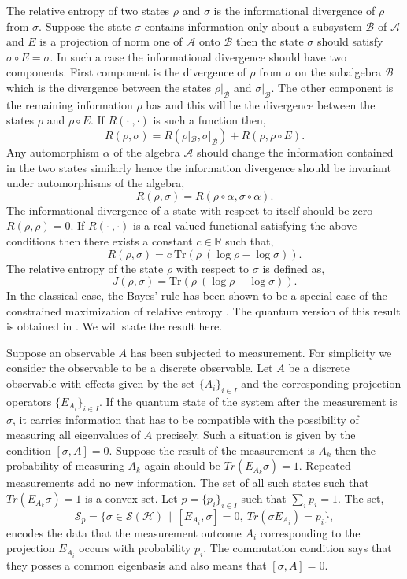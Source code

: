 \documentclass[11pt]{report}
\begin{document}
The relative entropy of two states $\rho$ and $\sigma$ is the informational divergence of $\rho$ from $\sigma$. Suppose the state $\sigma$ contains information only about a subsystem $\mathcal{B}$ of $\mathcal{A}$ and $E$ is a projection of norm one of $\mathcal{A}$ onto $\mathcal{B}$ then the state $\sigma$ should satisfy $\sigma\circ E= \sigma$.  In such a case the informational divergence should have two components. First component is the divergence of $\rho$ from $\sigma$ on the subalgebra $\mathcal{B}$ which is the divergence between the states $\rho|_\mathcal{B}$ and $ \sigma|_\mathcal{B}$. The other component is the remaining information $\rho$ has and this will be the divergence between the states $\rho$ and $ \rho\circ E$. If $R(\cdot\:,\cdot)$ is such a function then,
$$R(\rho, \sigma)= R(\rho|_\mathcal{B}, \sigma|_\mathcal{B})+R(\rho, \rho\circ E).$$
Any automorphism $\alpha$ of the algebra $\mathcal{A}$ should change the information contained in the two states similarly hence the information divergence should be invariant under automorphisms of the algebra,
$$R(\rho, \sigma)= R(\rho\circ \alpha, \sigma\circ \alpha).$$
The informational divergence of a state with respect to itself should be zero $R(\rho, \rho)=0.$ If $R(\cdot\:,\cdot)$ is a real-valued functional satisfying the above conditions then there exists a constant $c\in \mathbb{R}$ such that,
$$R(\rho, \sigma)=c\: \text{Tr}\left( \rho\:(\log \rho-\log \sigma)\right).$$
The relative entropy of the state $\rho$ with respect to $\sigma$ is defined as,
$$J(\rho,\sigma)=\text{Tr}\left( \rho\:(\log \rho-\log \sigma)\right).$$
In the classical case, the Bayes' rule has been shown to be a special case of the constrained maximization of relative entropy \cite{Williams}. The quantum version of this result is obtained in \cite{Kostecki1}. We will state the result here. 

Suppose an observable $A$ has been subjected to measurement. For simplicity we consider the observable to be a discrete observable. Let $A$ be a discrete observable with effects given by the set $\{A_i\}_{i\in I}$ and the corresponding projection operators $\{E_{A_i}\}_{i\in I}$. If the quantum state of the system after the measurement is $\sigma$, it carries information that has to be compatible with the possibility of measuring all eigenvalues of $A$ precisely. Such a situation is given by the condition $[\sigma, A] = 0$. Suppose the result of the measurement is $A_k$ then the probability of measuring $A_k$ again should be $Tr(E_{A_k}\sigma)=1$. Repeated measurements add no new information. The set of all such states such that $Tr(E_{A_k}\sigma)=1$ is a convex set. Let $p=\{p_i\}_{i\in I}$ such that $\sum_ip_i=1$. The set, 
$$\mathcal{S}_p=\{\sigma\in \mathcal{S}(\mathcal{H})\:\:|\:\:[E_{A_i},\sigma]=0,\:Tr(\sigma E_{A_i})=p_i\},$$
encodes the data that the measurement outcome $A_i$ corresponding to the projection $E_{A_i}$ occurs with probability $p_i$. The commutation condition says that they posses a common eigenbasis and also means that $[\sigma, A]=0$.
\end{document}
